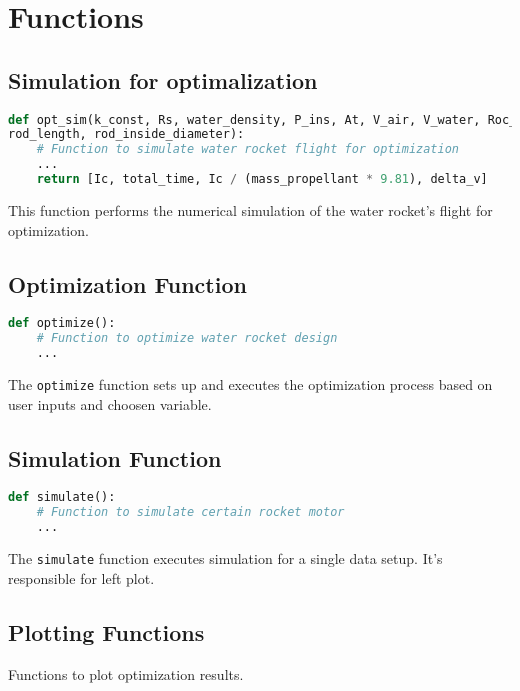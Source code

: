 \documentclass{report}
\begin{document}
\chapter{Functions}

\section{Simulation for optimalization}

\begin{lstlisting}[language=Python]
def opt_sim(k_const, Rs, water_density, P_ins, At, V_air, V_water, Roc_mass, T, 
rod_length, rod_inside_diameter):
    # Function to simulate water rocket flight for optimization
    ...
    return [Ic, total_time, Ic / (mass_propellant * 9.81), delta_v]
\end{lstlisting}

This function performs the numerical simulation of the water rocket's flight for optimization.

\section{Optimization Function}

\begin{lstlisting}[language=Python]
def optimize():
    # Function to optimize water rocket design
    ...
\end{lstlisting}

The \texttt{optimize} function sets up and executes the optimization process based on user inputs and choosen variable.

\section{Simulation Function}

\begin{lstlisting}[language=Python]
def simulate():
    # Function to simulate certain rocket motor
    ...
\end{lstlisting}

The \texttt{simulate} function executes simulation for a single data setup. It's responsible for left plot.
\newpage

\section{Plotting Functions}

Functions to plot optimization results.
\end{document}
